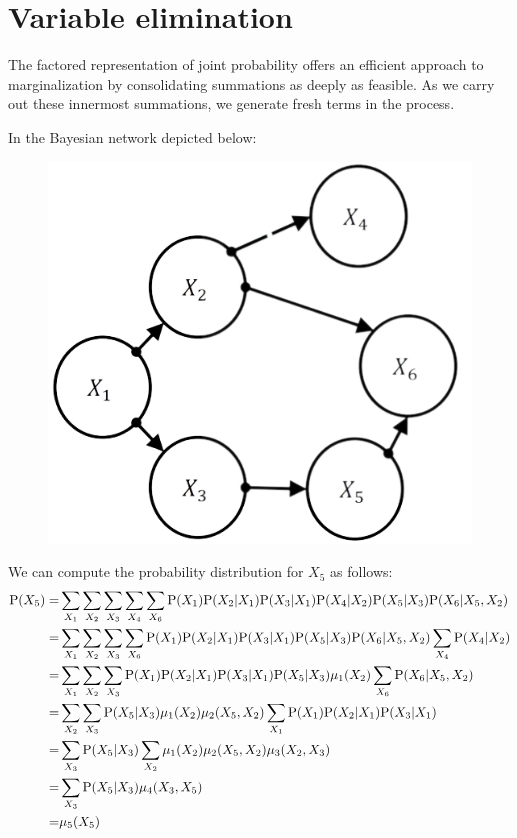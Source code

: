 \documentclass[12pt, a4paper]{report}
\begin{document}
    \section{Variable elimination}
    The factored representation of joint probability offers an efficient approach to marginalization by consolidating summations as deeply as feasible.
    As we carry out these innermost summations, we generate fresh terms in the process.
    \begin{example}
        In the Bayesian network depicted below:
        \begin{figure}[H]
            \centering
            \includegraphics[width=0.25\linewidth]{images/bn.png}
        \end{figure}
        We can compute the probability distribution for $X_5$ as follows:
        \begin{align*}
            \textnormal{P}(X_5)     =& \sum_{X_1}\sum_{X_2}\sum_{X_3}\sum_{X_4}\sum_{X_6}\textnormal{P}(X_1)\textnormal{P}(X_2|X_1)\textnormal{P}(X_3|X_1)\textnormal{P}(X_4|X_2)\textnormal{P}(X_5|X_3)\textnormal{P}(X_6|X_5,X_2)          \\
                                    =& \sum_{X_1}\sum_{X_2}\sum_{X_3}\sum_{X_6}\textnormal{P}(X_1)\textnormal{P}(X_2|X_1)\textnormal{P}(X_3|X_1)\textnormal{P}(X_5|X_3)\textnormal{P}(X_6|X_5,X_2)\sum_{X_4}\textnormal{P}(X_4|X_2)          \\ 
                                    =& \sum_{X_1}\sum_{X_2}\sum_{X_3}\textnormal{P}(X_1)\textnormal{P}(X_2|X_1)\textnormal{P}(X_3|X_1)\textnormal{P}(X_5|X_3)\mu_1(X_2)\sum_{X_6}\textnormal{P}(X_6|X_5,X_2)\\
                                    =& \sum_{X_2}\sum_{X_3}\textnormal{P}(X_5|X_3)\mu_1(X_2)\mu_2(X_5,X_2)\sum_{X_1}\textnormal{P}(X_1)\textnormal{P}(X_2|X_1)\textnormal{P}(X_3|X_1)     \\
                                    =& \sum_{X_3}\textnormal{P}(X_5|X_3)\sum_{X_2}\mu_1(X_2)\mu_2(X_5,X_2)\mu_3(X_2,X_3)\\
                                    =& \sum_{X_3}\textnormal{P}(X_5|X_3)\mu_4(X_3,X_5)\\
                                    =& \mu_5(X_5)
        \end{align*}
    \end{example}
\end{document}
